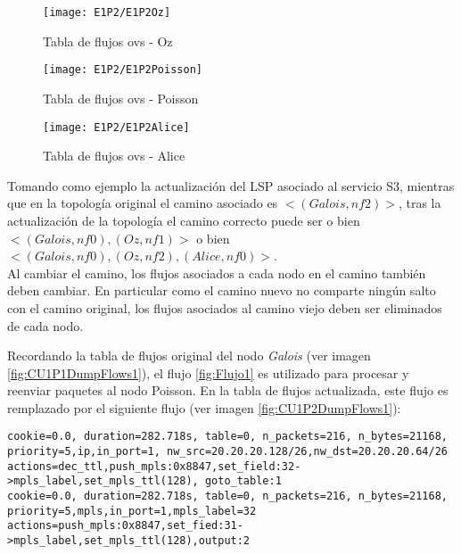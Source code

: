 \begin{figure}[h!] 
\centering    
\texttt{[image: E1P2/E1P2Oz]}
\caption[Tabla de flujos ovs - Oz]{Tabla de flujos ovs - Oz}
\label{fig:CU1P2DumpFlows2}
\end{figure}

\begin{figure}[h!] 
\centering    
\texttt{[image: E1P2/E1P2Poisson]}
\caption[Tabla de flujos ovs - Poisson]{Tabla de flujos ovs - Poisson}
\label{fig:CU1P2DumpFlows3}
\end{figure}

\newpage
\begin{figure}[ht!] 
\centering    
\texttt{[image: E1P2/E1P2Alice]}
\caption[Tabla de flujos ovs - Alice]{Tabla de flujos ovs - Alice}
\label{fig:CU1P2DumpFlows4}
\end{figure}

Tomando como ejemplo la actualizaci\'on del LSP asociado al servicio S3, mientras que en la topolog\'ia original el camino asociado es $<(Galois, nf2)>$, tras la actualizaci\'on de la topolog\'ia el camino correcto puede ser o bien $<(Galois, nf0),(Oz, nf1)>$ o bien \\ $<(Galois, nf0), (Oz, nf2), (Alice, nf0)>$.\\

Al cambiar el camino, los flujos asociados a cada nodo en el camino tambi\'en deben cambiar. En particular como el camino nuevo no comparte ning\'un salto con el camino original, los flujos asociados al camino viejo deben ser eliminados de cada nodo.

Recordando la tabla de flujos original del nodo \textit{Galois} (ver imagen \ref{fig:CU1P1DumpFlows1}), el flujo \ref{fig:Flujo1} es utilizado para procesar y reenviar paquetes al nodo Poisson. En la tabla de flujos actualizada, este flujo es remplazado por el siguiente flujo (ver imagen \ref{fig:CU1P2DumpFlows1}):

\begin{center}
\texttt{cookie=0.0, duration=282.718s, table=0, n\_packets=216, n\_bytes=21168, \\
priority=5,ip,in\_port=1, nw\_src=20.20.20.128/26,nw\_dst=20.20.20.64/26 \\
actions=dec\_ttl,push\_mpls:0x8847,set\_field:32->mpls\_label,set\_mpls\_ttl(128), goto\_table:1 \\
\vspace{0.5cm}
cookie=0.0, duration=282.718s, table=0, n\_packets=216, n\_bytes=21168, \\
priority=5,mpls,in\_port=1,mpls\_label=32 \\
actions=push\_mpls:0x8847,set\_fied:31->mpls\_label,set\_mpls\_ttl(128),output:2}
\end{center}


